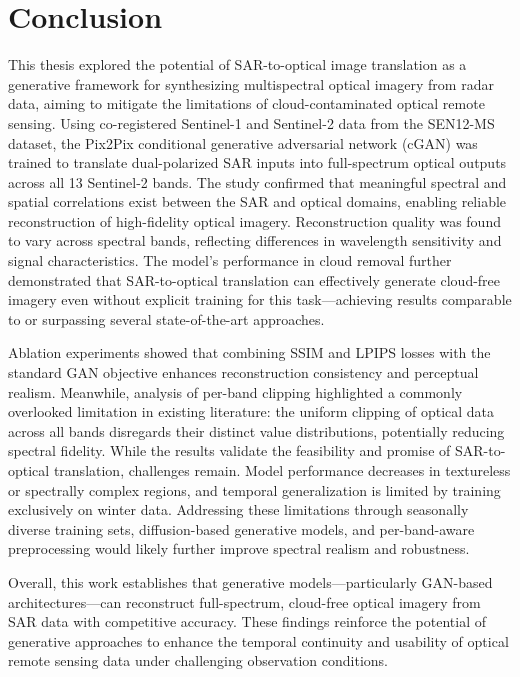 \chapter{Conclusion}
This thesis explored the potential of SAR-to-optical image translation as a generative framework for synthesizing multispectral optical imagery from radar data, aiming to mitigate the limitations of cloud-contaminated optical remote sensing. Using co-registered Sentinel-1 and Sentinel-2 data from the SEN12-MS dataset, the Pix2Pix conditional generative adversarial network (cGAN) was trained to translate dual-polarized SAR inputs into full-spectrum optical outputs across all 13 Sentinel-2 bands.
The study confirmed that meaningful spectral and spatial correlations exist between the SAR and optical domains, enabling reliable reconstruction of high-fidelity optical imagery. Reconstruction quality was found to vary across spectral bands, reflecting differences in wavelength sensitivity and signal characteristics. The model’s performance in cloud removal further demonstrated that SAR-to-optical translation can effectively generate cloud-free imagery even without explicit training for this task—achieving results comparable to or surpassing several state-of-the-art approaches.

Ablation experiments showed that combining SSIM and LPIPS losses with the standard GAN objective enhances reconstruction consistency and perceptual realism. Meanwhile, analysis of per-band clipping highlighted a commonly overlooked limitation in existing literature: the uniform clipping of optical data across all bands disregards their distinct value distributions, potentially reducing spectral fidelity.
While the results validate the feasibility and promise of SAR-to-optical translation, challenges remain. Model performance decreases in textureless or spectrally complex regions, and temporal generalization is limited by training exclusively on winter data. Addressing these limitations through seasonally diverse training sets, diffusion-based generative models, and per-band-aware preprocessing would likely further improve spectral realism and robustness.

Overall, this work establishes that generative models—particularly GAN-based architectures—can reconstruct full-spectrum, cloud-free optical imagery from SAR data with competitive accuracy. These findings reinforce the potential of generative approaches to enhance the temporal continuity and usability of optical remote sensing data under challenging observation conditions.
